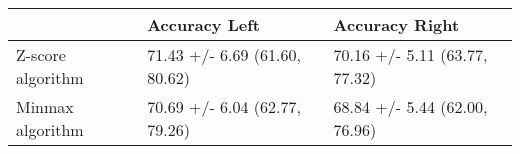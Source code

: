 \begin{tabular}{lll}
\toprule
{} &                  Accuracy Left &                 Accuracy Right \\
\midrule
Z-score algorithm &  71.43 +/- 6.69 (61.60, 80.62) &  70.16 +/- 5.11 (63.77, 77.32) \\
Minmax algorithm  &  70.69 +/- 6.04 (62.77, 79.26) &  68.84 +/- 5.44 (62.00, 76.96) \\
\bottomrule
\end{tabular}
